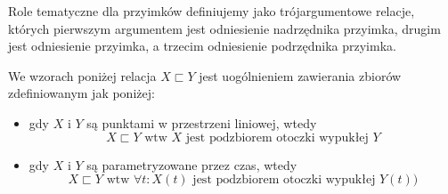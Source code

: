 \documentclass[a4paper, 12pt]{article}
\theoremstyle{remark}
\begin{document}
Role tematyczne dla przyimków definiujemy jako trójargumentowe relacje, których pierwszym argumentem jest odniesienie nadrzędnika przyimka, drugim jest odniesienie przyimka, a trzecim odniesienie podrzędnika przyimka.

We wzorach poniżej relacja $X\sqsubset Y$ jest uogólnieniem zawierania zbiorów zdefiniowanym jak poniżej:
\begin{itemize}
	\item gdy $X$ i $Y$ są punktami w przestrzeni liniowej, wtedy
	\begin{equation}
	X\sqsubset Y \text{\ wtw\ } X \text{\ jest podzbiorem otoczki wypukłej\ }Y
	\end{equation}
	\item gdy $X$ i $Y$ są parametryzowane przez czas, wtedy
	\begin{equation}
	X\sqsubset Y \text{\ wtw\ } \forall t: X(t) \text{\ jest podzbiorem otoczki wypukłej\ }Y(t))
	\end{equation}
\end{itemize}
\end{document}
